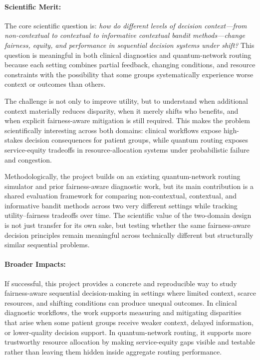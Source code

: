 \documentclass[11pt]{article}
\begin{document}
\paragraph{Scientific Merit:} \hspace{-5mm}
The core scientific question is: {\it how do different levels of decision context---from non-contextual to contextual to informative contextual bandit methods---change fairness, equity, and performance in sequential decision systems under shift?} This question is meaningful in both clinical diagnostics and quantum-network routing because each setting combines partial feedback, changing conditions, and resource constraints with the possibility that some groups systematically experience worse context or outcomes than others.

The challenge is not only to improve utility, but to understand when additional context materially reduces disparity, when it merely shifts who benefits, and when explicit fairness-aware mitigation is still required. This makes the problem scientifically interesting across both domains: clinical workflows expose high-stakes decision consequences for patient groups, while quantum routing exposes service-equity tradeoffs in resource-allocation systems under probabilistic failure and congestion.

Methodologically, the project builds on an existing quantum-network routing simulator and prior fairness-aware diagnostic work, but its main contribution is a shared evaluation framework for comparing non-contextual, contextual, and informative bandit methods across two very different settings while tracking utility--fairness tradeoffs over time. The scientific value of the two-domain design is not just transfer for its own sake, but testing whether the same fairness-aware decision principles remain meaningful across technically different but structurally similar sequential problems.



\paragraph{Broader Impacts:} \hspace{-5mm}
If successful, this project provides a concrete and reproducible way to study fairness-aware sequential decision-making in settings where limited context, scarce resources, and shifting conditions can produce unequal outcomes. In clinical diagnostic workflows, the work supports measuring and mitigating disparities that arise when some patient groups receive weaker context, delayed information, or lower-quality decision support. In quantum-network routing, it supports more trustworthy resource allocation by making service-equity gaps visible and testable rather than leaving them hidden inside aggregate routing performance.
\end{document}
